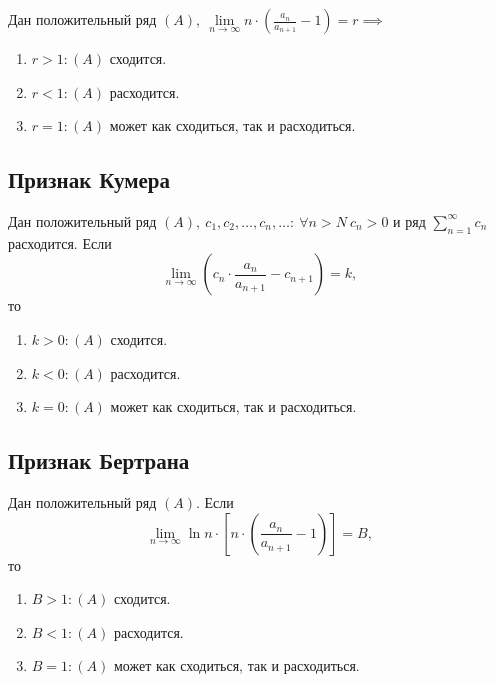 \begin{theorem}
    Дан положительный ряд $(A), \ \underset{n\rightarrow\infty}{\lim}n \cdot \left(\frac{a_n}{a_{n+1}} - 1\right) = r \implies $
    \begin{enumerate}
        \item $r>1: (A)$ сходится.
        \item $r<1: (A)$ расходится.
        \item $r=1: (A)$ может как сходиться, так и расходиться.
    \end{enumerate}
\end{theorem}

\subsection{Признак Кумера}

\begin{theorem}
    Дан положительный ряд $(A), \ c_1,c_2,\ldots,c_n,\ldots: \ \forall n > N \ c_n > 0$ и ряд $\sum_{n=1}^{\infty}c_n$ расходится. Если
    \[
        \underset{n\rightarrow\infty}{\lim}\left(c_n \cdot \frac{a_n}{a_{n+1}} - c_{n+1}\right) = k,
    \]
    то
    \begin{enumerate}
        \item $k > 0: (A)$ сходится.
        \item $k < 0: (A)$ расходится.
        \item $k = 0: (A)$ может как сходиться, так и расходиться.
    \end{enumerate}
\end{theorem}

\subsection{Признак Бертрана}

\begin{theorem}
    Дан положительный ряд $(A)$. Если
    \[
        \underset{n\rightarrow\infty}{\lim} \ln n \cdot \left[n \cdot \left(\frac{a_n}{a_{n+1}} - 1\right)\right] = B,
    \]
    то
    \begin{enumerate}
        \item $B > 1: (A)$ сходится.
        \item $B < 1: (A)$ расходится.
        \item $B = 1: (A)$ может как сходиться, так и расходиться.
    \end{enumerate}
\end{theorem}


